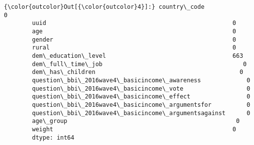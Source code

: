 \documentclass[11pt]{article}
\begin{document}
\begin{Verbatim}[commandchars=\\\{\}]
{\color{outcolor}Out[{\color{outcolor}4}]:} country\_code                                             0
        uuid                                                     0
        age                                                      0
        gender                                                   0
        rural                                                    0
        dem\_education\_level                                    663
        dem\_full\_time\_job                                        0
        dem\_has\_children                                         0
        question\_bbi\_2016wave4\_basicincome\_awareness             0
        question\_bbi\_2016wave4\_basicincome\_vote                  0
        question\_bbi\_2016wave4\_basicincome\_effect                0
        question\_bbi\_2016wave4\_basicincome\_argumentsfor          0
        question\_bbi\_2016wave4\_basicincome\_argumentsagainst      0
        age\_group                                                0
        weight                                                   0
        dtype: int64
\end{Verbatim}
            
\end{document}
